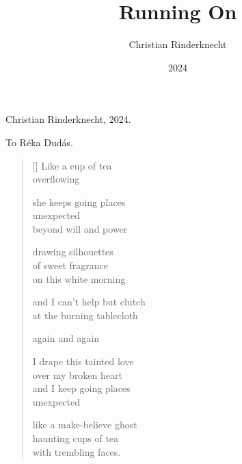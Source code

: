 \documentclass[14pt]{extbook}
\title{Running On}
\author{Christian Rinderknecht}
\date{\small 2024}
\newcommand*{\centeredornament}{\centerline{\pgfornament[width=6cm]{88}}}
\begin{document}


\thispagestyle{empty}

\mbox{}
\thispagestyle{empty}

\newpage

\thispagestyle{empty}

\maketitle

\thispagestyle{empty}

\vspace*{14cm}

\begin{flushright}
  \textcopyright{} Christian Rinderknecht, 2024.
\end{flushright}

\newpage

\vspace*{4cm}

\begin{flushright}
To Réka Dudás.
\end{flushright}

\thispagestyle{empty}


\newpage\leavevmode\thispagestyle{empty}\newpage



\newpage

\vspace*{-15mm}
\centeredornament
\vspace*{-7mm}


\settowidth{\versewidth}{Like a make-believe ghost}

\begin{verse}[\versewidth]
  Like a cup of tea \\
  overflowing

  she keeps going places \\
  unexpected \\
  beyond will and power

  drawing silhouettes \\
  of sweet fragrance \\
  on this white morning

  and I can't help but clutch \\
  at the burning tablecloth

  again and again

  I drape this tainted love \\
  over my broken heart \\
  and I keep going places \\
  unexpected

  like a make-believe ghost \\
  haunting cups of tea \\
  with trembling faces.
\end{verse}
\end{document}
